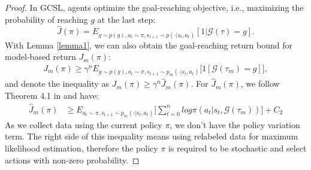 \documentclass{article}
\begin{document}
\begin{proof}
In GCSL, agents optimize the goal-reaching objective, i.e., maximizing the probability of reaching $g$ at the last step:
\begin{equation*}
    \hat J(\pi) = E_{g\sim p(g), a_t \sim \pi, s_{t+1} \sim p(\cdot|s_t,a_t)}[1|\mathcal{G}(\tau)=g].
\end{equation*}
With Lemma \ref{lemma1}, we can also obtain the goal-reaching return bound for model-based return $J_m(\pi)$:
\begin{equation*}
\begin{aligned}
        J_m(\pi) \geq \gamma^n E_{g\sim p(g),a_t \sim \pi, s_{t+1}\sim p_m(\cdot|s_t,a_t)}\big[1[\mathcal{G}(\tau_m) = g] \big] ,
\end{aligned}
\end{equation*}
and denote the inequality as $J_m(\pi) \geq \gamma^n \hat J_m(\pi)$. 
For $\hat J_m(\pi)$, we follow Theorem 4.1 in \cite{ghosh2021learning} and have:
\begin{equation*}
\begin{aligned}
    \hat J_m(\pi) &\geq E_{a_t \sim \pi, s_{t+1} \sim p_m(\cdot|s_t,a_t)} \big[ \sum_{t=0}^n log\pi(a_t|s_t,\mathcal{G}(\tau_m))  \big] + C_2
\end{aligned}
\end{equation*}
As we collect data using the current policy $\pi$, we don't have the policy variation term. The right side of this inequality means using relabeled data for maximum likelihood estimation, therefore the policy $\pi$ is required to be stochastic and select actions with non-zero probability. 


\end{proof}
\end{document}
